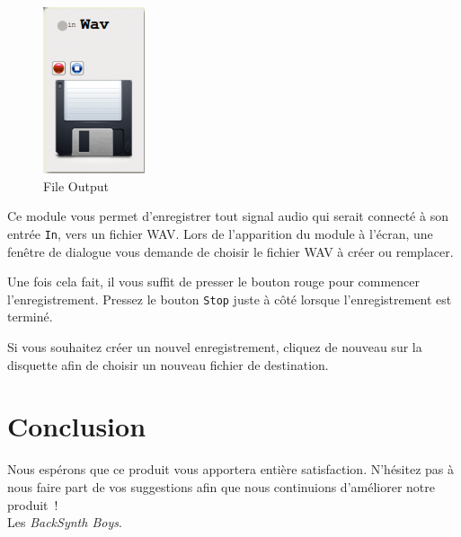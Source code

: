\documentclass[a4paper,oneside,frenchb,10pt]{article}
\begin{document}
\begin{multicols}{2}
\begin{figure}[H]
\centering
\includegraphics[width=3cm]{../img/png/wavrecorder.png}
\caption{File Output}
\end{figure}

Ce module vous permet d'enregistrer tout signal audio qui serait
connecté à son entrée \verb!In!, vers un fichier WAV. Lors de
l'apparition du module à l'écran, une fenêtre de dialogue vous demande de
choisir le fichier WAV à créer ou remplacer.

Une fois cela fait, il vous
suffit de presser le bouton rouge pour commencer l'enregistrement.
Pressez le bouton \verb!Stop! juste à côté lorsque l'enregistrement est
terminé.

Si vous souhaitez créer un nouvel enregistrement, cliquez de nouveau sur
la disquette afin de choisir un nouveau fichier de destination.

\end{multicols}

\section{Conclusion}

Nous espérons que ce produit vous apportera entière satisfaction.
N'hésitez pas à nous faire part de vos suggestions afin que nous
continuions d'améliorer notre produit~!\\

Les \emph{BackSynth Boys}.
\end{document}

